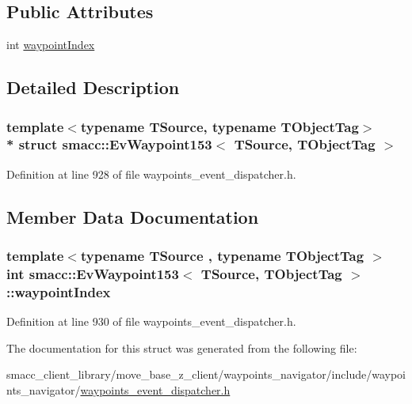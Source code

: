 \subsection*{Public Attributes}
\begin{DoxyCompactItemize}
\item 
int \hyperlink{structsmacc_1_1EvWaypoint153_a515e35717912c3d84b5795e36d6756c4}{waypoint\+Index}
\end{DoxyCompactItemize}


\subsection{Detailed Description}
\subsubsection*{template$<$typename T\+Source, typename T\+Object\+Tag$>$\\*
struct smacc\+::\+Ev\+Waypoint153$<$ T\+Source, T\+Object\+Tag $>$}



Definition at line 928 of file waypoints\+\_\+event\+\_\+dispatcher.\+h.



\subsection{Member Data Documentation}
\subsubsection[{\texorpdfstring{waypoint\+Index}{waypointIndex}}]{\setlength{\rightskip}{0pt plus 5cm}template$<$typename T\+Source , typename T\+Object\+Tag $>$ int {\bf smacc\+::\+Ev\+Waypoint153}$<$ T\+Source, T\+Object\+Tag $>$\+::waypoint\+Index}\hypertarget{structsmacc_1_1EvWaypoint153_a515e35717912c3d84b5795e36d6756c4}{}\label{structsmacc_1_1EvWaypoint153_a515e35717912c3d84b5795e36d6756c4}


Definition at line 930 of file waypoints\+\_\+event\+\_\+dispatcher.\+h.



The documentation for this struct was generated from the following file\+:\begin{DoxyCompactItemize}
\item 
smacc\+\_\+client\+\_\+library/move\+\_\+base\+\_\+z\+\_\+client/waypoints\+\_\+navigator/include/waypoints\+\_\+navigator/\hyperlink{waypoints__event__dispatcher_8h}{waypoints\+\_\+event\+\_\+dispatcher.\+h}\end{DoxyCompactItemize}
